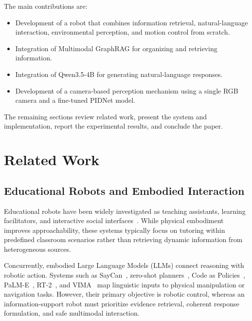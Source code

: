\documentclass[conference]{IEEEtran}
\begin{document}
The main contributions are:

\begin{itemize}
    \item Development of a robot that combines information retrieval, natural-language interaction, environmental perception, and motion control from scratch.

    \item Integration of Multimodal GraphRAG for organizing and retrieving information.

    \item Integration of Qwen3.5-4B for generating natural-language responses.

    \item Development of a camera-based perception mechanism using a single RGB camera and a fine-tuned PIDNet model.


\end{itemize}

The remaining sections review related work, present the system and implementation, report the experimental results, and conclude the paper.



\section{Related Work}\label{sec2}

\subsection{Educational Robots and Embodied Interaction}\label{sec2a}
Educational robots have been widely investigated as teaching assistants, learning facilitators, and interactive social interfaces~\cite{rosenbergkima2020rscl,donnermann2024integration,donnermann2025highereducation,budagov2026robotta}. While physical embodiment improves approachability, these systems typically focus on tutoring within predefined classroom scenarios rather than retrieving dynamic information from heterogeneous sources. 

Concurrently, embodied Large Language Models (LLMs) connect reasoning with robotic action. Systems such as SayCan~\cite{ahn2022saycan}, zero-shot planners~\cite{huang2022zeroshot}, Code as Policies~\cite{liang2023codeaspolicies}, PaLM-E~\cite{driess2023palme}, RT-2~\cite{zitkovich2023rt2}, and VIMA~\cite{jiang2023vima} map linguistic inputs to physical manipulation or navigation tasks. However, their primary objective is robotic control, whereas an information-support robot must prioritize evidence retrieval, coherent response formulation, and safe multimodal interaction.
\end{document}
